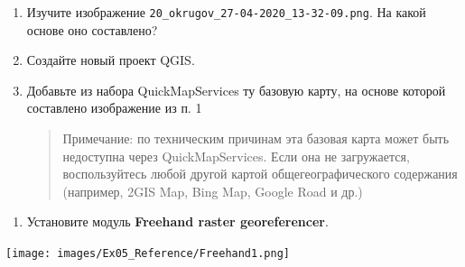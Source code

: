 \documentclass[
  12pt,
]{book}
\providecommand{\tightlist}{%
  \setlength{\itemsep}{0pt}\setlength{\parskip}{0pt}}
\begin{document}
\begin{enumerate}
\def\labelenumi{\arabic{enumi}.}
\item
  Изучите изображение \texttt{20\_okrugov\_27-04-2020\_13-32-09.png}. На какой основе оно составлено?
\item
  Создайте новый проект QGIS.
\item
  Добавьте из набора QuickMapServices ту базовую карту, на основе которой составлено изображение из п. 1

  \begin{quote}
  Примечание: по техническим причинам эта базовая карта может быть недоступна через QuickMapServices. Если она не загружается, воспользуйтесь любой другой картой общегеографического содержания (например, 2GIS Map, Bing Map, Google Road и др.)
  \end{quote}
\end{enumerate}

\begin{enumerate}
\def\labelenumi{\arabic{enumi}.}
\setcounter{enumi}{3}
\tightlist
\item
  Установите модуль \textbf{Freehand raster georeferencer}.
\end{enumerate}

\texttt{[image: images/Ex05\_Reference/Freehand1.png]}
\end{document}
